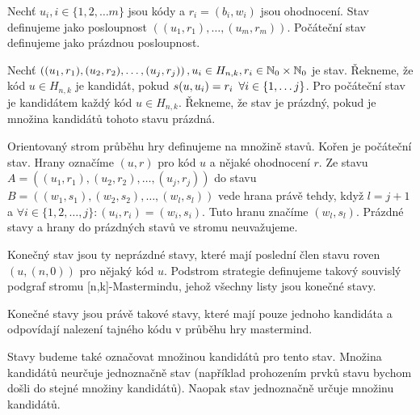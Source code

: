 \begin{definice}[Stav]\label{stav}
   Nechť $u_i, i\in \{1,2,\dots m\}$ jsou kódy a $r_i = (b_i,w_i)$ jsou ohodnocení. Stav definujeme jako posloupnost $((u_1, r_1), \dots, (u_m, r_m))$. Počáteční stav definujeme jako prázdnou posloupnost.
\end{definice}

\begin{definice}[kandidát]\label{kandidat}
  Nechť $\left((u_1, r_1), (u_2,r_2), \dots, (u_j,r_j)\right), u_i \in H_{n,k}, r_i \in \mathbb{N} _0 \times \mathbb{N} _0$ je stav. Řekneme, že kód $u \in H_{n,k}$ je kandidát, pokud $s(u,u_i) = r_i \hspace{5px} \forall i \in \{1, \dots j\}$. Pro počáteční stav je kandidátem každý kód $u \in H_{n,k}$. Řekneme, že stav je prázdný, pokud je množina kandidátů tohoto stavu prázdná. 
\end{definice}

\begin{definice}
  Orientovaný strom průběhu hry definujeme na množině stavů. Kořen je počáteční stav. Hrany označíme $(u, r)$ pro kód $u$ a nějaké ohodnocení $r$. Ze stavu $A = \left((u_1, r_1), (u_2,r_2), \dots, (u_j,r_j)\right)$ do stavu $B = \left((w_1, s_1), (w_2,s_2), \dots, (w_l,s_l)\right)$ vede hrana právě tehdy, když $l = j+1$ a $\forall i \in \{1,2,\dots, j\} \colon (u_i, r_i) = (w_i, s_i)$. Tuto hranu značíme $(w_l, s_l)$. Prázdné stavy a hrany do prázdných stavů ve stromu neuvažujeme.
\end{definice}

\begin{definice}
  Konečný stav jsou ty neprázdné stavy, které mají poslední člen stavu roven $(u,(n,0))$ pro nějaký kód $u$.
  Podstrom strategie definujeme takový souvislý podgraf stromu [n,k]-Mastermindu, jehož všechny listy jsou konečné stavy. 
\end{definice}
\begin{pozn}
    Konečné stavy jsou právě takové stavy, které mají pouze jednoho kandidáta a odpovídají nalezení tajného kódu v průběhu hry mastermind. 
\end{pozn}
\begin{pozn}
    Stavy budeme také označovat množinou kandidátů pro tento stav. Množina kandidátů neurčuje jednoznačně stav (například prohozením prvků stavu bychom došli do stejné množiny kandidátů). Naopak stav jednoznačně určuje množinu kandidátů. 
\end{pozn}

